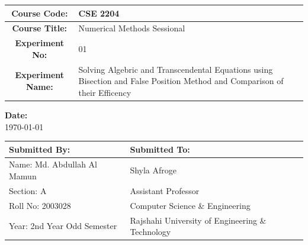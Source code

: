 \documentclass[a4paper,12pt]{report}
\begin{document}
\begin{titlepage}
\begin{center}
        \begin{table}[h]
            \centering
            \begin{tabularx}{0.7\paperwidth}{|c|X|}
                \hline
                \textbf{Course Code:}     & CSE 2204                                                                                                                  \\
                \hline
                \textbf{Course Title:}    & Numerical Methods Sessional                                                                                               \\
                \hline
                \textbf{Experiment No:}   & 01                                                                                                                        \\
                \hline
                \textbf{Experiment Name:} & Solving Algebric and Transcendental Equations using Bisection and False Position Method and Comparison of their Efficency \\
                \hline
            \end{tabularx}%
        \end{table}

        \vspace{0.5in}
        \textbf{Date:} \\
        \today

        \vfill

        \begin{table}[h]
            \centering
            \begin{tabularx}{0.7\paperwidth}{|X|X|}
                \hline
                Submitted By:               & Submitted To:                                    \\
                \hline
                Name: Md. Abdullah Al Mamun & Shyla Afroge                                     \\
                \hline
                Section: A                  & Assistant Professor                              \\
                \hline
                Roll No: 2003028            & Computer Science \& Engineering                  \\
                \hline
                Year: 2nd Year Odd Semester & Rajshahi University of Engineering \& Technology \\
                \hline
            \end{tabularx}
        \end{table}
    \end{center}
\end{titlepage}
\end{document}
